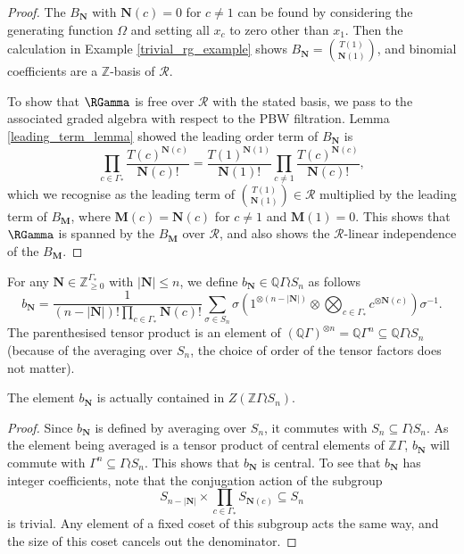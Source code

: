 \begin{proof}
The $B_{\mathbf{N}}$ with $\mathbf{N}(c) = 0$ for $c \neq 1$ can be found by considering the generating function $\Omega$ and setting all $x_c$ to zero other than $x_1$. Then the calculation in Example \ref{trivial_rg_example} shows $B_{\mathbf{N}} = \binom{T(1)}{\mathbf{N}(1)}$, and binomial coefficients are a $\mathbb{Z}$-basis of $\mathcal{R}$.

To show that $\RGamma$ is free over $\mathcal{R}$ with the stated basis, we pass to the associated graded algebra with respect to the PBW filtration. Lemma \ref{leading_term_lemma} showed the leading order term of $B_{\mathbf{N}}$ is 
\[
\prod_{c \in \Gamma_*} \frac{T(c)^{\mathbf{N}(c)}}{\mathbf{N}(c)!} = 
\frac{T(1)^{\mathbf{N}(1)}}{\mathbf{N}(1)!}  \prod_{c \neq 1} \frac{T(c)^{\mathbf{N}(c)}}{\mathbf{N}(c)!},
\]
which we recognise as the leading term of $\binom{T(1)}{\mathbf{N}(1)} \in \mathcal{R}$ multiplied by the leading term of $B_{\mathbf{M}}$, where $\mathbf{M}(c) = \mathbf{N}(c)$ for $c \neq 1$ and $\mathbf{M}(1) = 0$. This shows that $\RGamma$ is spanned by the $B_{\mathbf{M}}$ over $\mathcal{R}$, and also shows the $\mathcal{R}$-linear independence of the $B_{\mathbf{M}}$.
\end{proof}



\begin{definition}
For any $\mathbf{N} \in \mathbb{Z}_{\geq 0}^{\Gamma_*}$ with $|\mathbf{N}| \leq n$, we define $b_{\mathbf{N}} \in \mathbb{Q}\Gamma \wr S_n$ as follows
\[
b_{\mathbf{N}} = \frac{1}{(n - |\mathbf{N}|)! \prod_{c \in \Gamma_*} \mathbf{N}(c)!}
\sum_{\sigma \in S_n} \sigma \left( 1^{\otimes (n - |\mathbf{N}|)} \otimes \bigotimes_{c \in \Gamma_*} c^{\otimes \mathbf{N}(c)} \right) \sigma^{-1}.
\]
The parenthesised tensor product is an element of $(\mathbb{Q} \Gamma)^{\otimes n} = \mathbb{Q}\Gamma^n \subseteq \mathbb{Q}\Gamma \wr S_n$ \textup{(}because of the averaging over $S_n$, the choice of order of the tensor factors does not matter\textup{)}.
\end{definition}
\begin{lemma}
The element $b_{\mathbf{N}}$ is actually contained in $Z(\mathbb{Z}\Gamma \wr S_n)$.
\end{lemma}
\begin{proof}
Since $b_{\mathbf{N}}$ is defined by averaging over $S_n$, it commutes with $S_n \subseteq \Gamma \wr S_n$. As the element being averaged is a tensor product of central elements of $\mathbb{Z}\Gamma$, $b_{\mathbf{N}}$ will commute with $\Gamma^n \subseteq \Gamma \wr S_n$. This shows that $b_{\mathbf{N}}$ is central. To see that $b_{\mathbf{N}}$ has integer coefficients, note that the conjugation action of the subgroup 
\[
S_{n - |\mathbf{N}|} \times \prod_{c \in \Gamma_*} S_{\mathbf{N}(c)} \subseteq S_n
\]
is trivial. Any element of a fixed coset of this subgroup acts the same way, and the size of this coset cancels out the denominator.
\end{proof}

